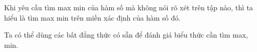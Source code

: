 \begin{note}
	\begin{listEX}[1]
		\item [\ding{172}] Khi yêu cầu tìm max min của hàm số mà không nói rõ xét trên tập nào, thì ta hiểu là tìm max min trên miền xác định của hàm số đó.
	\item [\ding{175}] Ta có thể dùng các bất đẳng thức có sẵn để đánh giá biểu thức cần tìm max, min. 
	\end{listEX}
\end{note}
